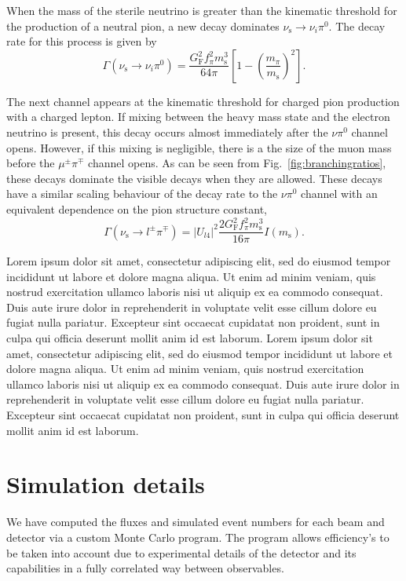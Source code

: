 \documentclass[11pt, a4paper]{article}
\newcommand{\reffig}[1]{Fig.~\ref{#1}}
\newcommand{\lorem}{ \textcolor[rgb]{0.8,0.8,0.8}{Lorem ipsum dolor sit amet, consectetur
adipiscing elit, sed do eiusmod tempor incididunt ut labore et dolore magna
aliqua. Ut enim ad minim veniam, quis nostrud exercitation ullamco laboris nisi
ut aliquip ex ea commodo consequat. Duis aute irure dolor in reprehenderit in
voluptate velit esse cillum dolore eu fugiat nulla pariatur. Excepteur sint
occaecat cupidatat non proident, sunt in culpa qui officia deserunt mollit anim
id est laborum.}}
\begin{document}
When the mass of the sterile neutrino is greater than the kinematic threshold
for the production of a neutral pion, a new decay dominates
$\nu_\text{s}\to\nu_i \pi^0$. The decay rate for this process is given by
%
\[ \Gamma\left(\nu_\text{s} \to \nu_i \pi^0\right) =
\frac{G_\text{F}^2f_\pi^2m_\text{s}^3}{64\pi}\left[1-\left(\frac{m_\pi}{m_\text{s}}\right)^2\right].
\]

The next channel appears at the kinematic threshold for charged pion production
with a charged lepton. If mixing between the heavy mass state and the electron
neutrino is present, this decay occurs almost immediately after the $\nu\pi^0$
channel opens. However, if this mixing is negligible, there is a the size of
the muon mass before the $\mu^\pm\pi^\mp$ channel opens. As can be seen from
\reffig{fig:branchingratios}, these decays dominate the visible decays when
they are allowed. These decays have a similar scaling behaviour of the decay
rate to the $\nu\pi^0$ channel with an equivalent dependence on the pion
structure constant,
%
\[ \Gamma\left(\nu_\text{s} \to l^\pm\pi^\mp\right) =
\left|U_{l4}\right|^2\frac{2G_\text{F}^2f_\pi^2m_\text{s}^3}{16\pi}I(m_\text{s}).
\]


\lorem\lorem

\section{Simulation details}

We have computed the fluxes and simulated event numbers for each beam and
detector via a custom Monte Carlo program. The program allows efficiency's to
be taken into account due to experimental details of the detector and its
capabilities in a fully correlated way between observables. 
\end{document}
